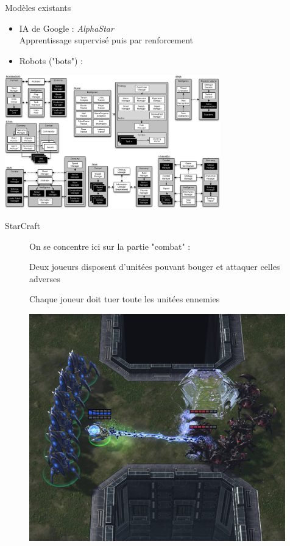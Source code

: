 \documentclass[french]{beamer}
\begin{document}
\begin{frame}{Modèles existants}
	\begin{itemize}
		\item IA de Google : \textit{AlphaStar} 
			\\Apprentissage supervisé puis par renforcement
		\item Robots ("bots") :
	\end{itemize}
	\centering
	\includegraphics[width=0.7\textwidth]{architectures.png} 
\end{frame}
\begin{frame}{StarCraft}
\begin{figure}
	\centering
	\begin{minipage}{0.45\textwidth}
		On se concentre ici sur la partie "combat" :

		Deux joueurs disposent d'unitées pouvant bouger et attaquer celles adverses

		Chaque joueur doit tuer toute les unitées ennemies
	\end{minipage}\hfill
	\begin{minipage}{0.5\textwidth}
		\centering
		\includegraphics[width=0.99\textwidth]{screen_starcraft_combat.png}
	\end{minipage}
\end{figure}
\end{frame}
\end{document}
